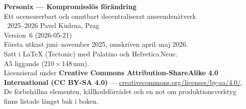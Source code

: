\thispagestyle{empty}
\ifdefined\printmode\vspace*{\fill}\else{}\fi
\begin{flushleft}\small\sffamily
\textbf{Personix --- Kompromisslös förändring}\\[0.3em]
Ett ocensurerbart och omutbart decentraliserat anseendenätverk\\[1.4em]

\textcopyright\ 2025--2026 Pavel Kudrna, Prag\\[0.4em]

Version~6 (2026-05-21)\\
Första utkast juni--november 2025, omskriven april--maj 2026.\\[1.4em]

Satt i \LaTeX{} (Tectonic) med Palatino och Helvetica\,Neue.\\
A5 liggande (210\,$\times$\,148\,mm).\\[1.4em]

Licensierad under \textbf{Creative Commons Attribution-ShareAlike 4.0
International (CC BY-SA 4.0)} ---
\href{https://creativecommons.org/licenses/by-sa/4.0/}{creativecommons.org/licenses/by-sa/4.0/}.
De förbehållna elementen, källkodsförrådet och en not om produktionsverktyg
finns listade längst bak i boken.
\end{flushleft}
\ifdefined\printmode\else{}\fi
\clearpage
